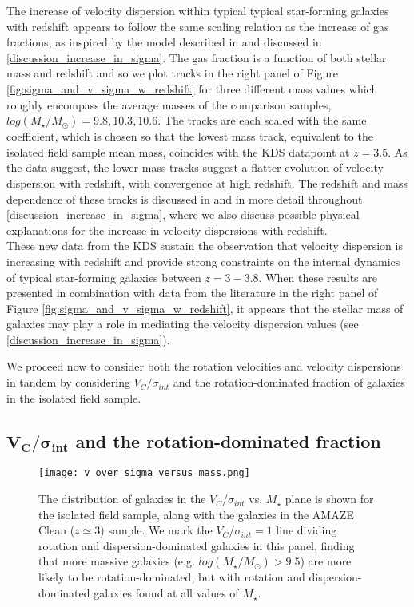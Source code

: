 \documentclass[fleqn,usenatbib]{mnras}
\begin{document}
The increase of velocity dispersion within typical typical star-forming galaxies with redshift appears to follow the same scaling relation as the increase of gas fractions, as inspired by the model described in \cite{Wisnioski2015} and discussed in \cref{discussion_increase_in_sigma}. 
The gas fraction is a function of both stellar mass and redshift and so we plot tracks in the right panel of Figure \ref{fig:sigma_and_v_sigma_w_redshift} for three different mass values which roughly encompass the average masses of the comparison samples, $log(M_{\star}/M_{\odot})=9.8,10.3,10.6$.
The tracks are each scaled with the same coefficient, which is chosen so that the lowest mass track, equivalent to the isolated field sample mean mass, coincides with the KDS datapoint at $z=3.5$.
As the data suggest, the lower mass tracks suggest a flatter evolution of velocity dispersion with redshift, with convergence at high redshift.  
The redshift and mass dependence of these tracks is discussed in \cite{Wisnioski2015} and in more detail throughout \cref{discussion_increase_in_sigma}, where we also discuss possible physical explanations for the increase in velocity dispersions with redshift. \\

These new data from the KDS sustain the observation that velocity dispersion is increasing with redshift and provide strong constraints on the internal dynamics of typical star-forming galaxies between $z=3-3.8$.
When these results are presented in combination with data from the literature in the right panel of Figure \ref{fig:sigma_and_v_sigma_w_redshift}, it appears that the stellar mass of galaxies may play a role in mediating the velocity dispersion values (see \cref{discussion_increase_in_sigma}).

We proceed now to consider both the rotation velocities and velocity dispersions in tandem by considering $V_{C}/\sigma_{int}$ and the rotation-dominated fraction of galaxies in the isolated field sample.

\subsection{$\boldsymbol{V_{C}/\sigma_{int}}$ and the rotation-dominated fraction}\label{subsec:rdf_v_over_sigma}

\begin{figure}
    \centering \hspace{-1.13cm}
    \texttt{[image: v\_over\_sigma\_versus\_mass.png]}
    \caption{The distribution of galaxies in the $V_{C}$/$\sigma_{int}$ vs. $M_{\star}$ plane is shown for the isolated field sample, along with the galaxies in the AMAZE Clean ($z\simeq3$) sample.
    We mark the $V_{C}$/$\sigma_{int}=1$ line dividing rotation and dispersion-dominated galaxies in this panel, finding that more massive galaxies (e.g. $log(M_{\star}/M_{\odot}) > 9.5$) are more likely to be rotation-dominated, but with rotation and dispersion-dominated galaxies found at all values of $M_{\star}$.}
    \label{fig:v_sig_and_v}
\end{figure}
\end{document}
